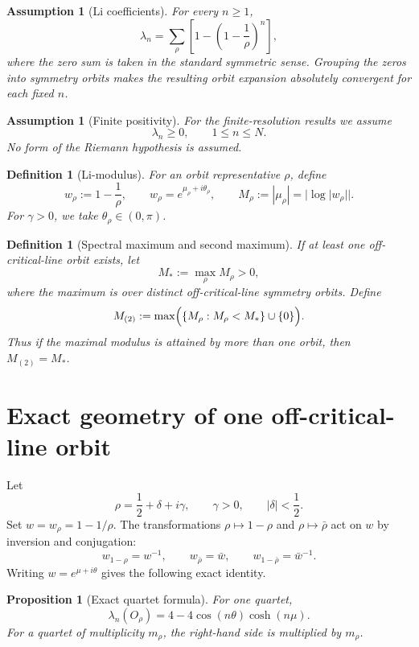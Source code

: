 \documentclass[11pt]{article}
\newtheorem{proposition}[theorem]{Proposition}
\newtheorem{definition}[theorem]{Definition}
\newtheorem{assumption}[theorem]{Assumption}
\newcommand{\Li}{\lambda}
\begin{document}
\begin{assumption}[Li coefficients]
For every \(n\ge1\),
\[
\Li_n=\sum_\rho\left[1-\left(1-\frac1\rho\right)^n\right],
\]
where the zero sum is taken in the standard symmetric sense. Grouping the zeros into symmetry orbits makes the resulting orbit expansion absolutely convergent for each fixed \(n\).
\end{assumption}

\begin{assumption}[Finite positivity]
For the finite-resolution results we assume
\[
\Li_n\ge0,\qquad 1\le n\le N.
\]
No form of the Riemann hypothesis is assumed.
\end{assumption}

\begin{definition}[Li-modulus]
For an orbit representative \(\rho\), define
\[
w_\rho:=1-\frac1\rho,
\qquad
w_\rho=e^{\mu_\rho+i\theta_\rho},
\qquad
M_\rho:=|\mu_\rho|=|\log|w_\rho||.
\]
For \(\gamma>0\), we take \(\theta_\rho\in(0,\pi)\).
\end{definition}

\begin{definition}[Spectral maximum and second maximum]
If at least one off-critical-line orbit exists, let
\[
M_*:=\max_\rho M_\rho>0,
\]
where the maximum is over distinct off-critical-line symmetry orbits. Define
\[
M_{(2)}:=\max\Bigl(\{M_\rho:M_\rho<M_*\}\cup\{0\}\Bigr).
\]
Thus if the maximal modulus is attained by more than one orbit, then \(M_{(2)}=M_*\).
\end{definition}

\section{Exact geometry of one off-critical-line orbit}

Let
\[
\rho=\frac12+\delta+i\gamma,
\qquad
\gamma>0,
\qquad
|\delta|<\frac12.
\]
Set \(w=w_\rho=1-1/\rho\). The transformations \(\rho\mapsto1-\rho\) and \(\rho\mapsto\bar\rho\) act on \(w\) by inversion and conjugation:
\[
w_{1-\rho}=w^{-1},
\qquad
w_{\bar\rho}=\bar w,
\qquad
w_{1-\bar\rho}=\bar w^{-1}.
\]
Writing \(w=e^{\mu+i\theta}\) gives the following exact identity.

\begin{proposition}[Exact quartet formula]
For one quartet,
\begin{equation}
\Li_n(O_\rho)=4-4\cos(n\theta)\cosh(n\mu).
\label{eq:quartet}
\end{equation}
For a quartet of multiplicity \(m_\rho\), the right-hand side is multiplied by \(m_\rho\).
\end{proposition}
\end{document}
